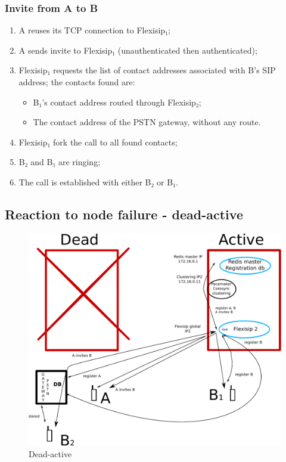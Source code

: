 \documentclass[a4paper,10pt]{article}
\begin{document}
\subsubsection{Invite from A to B}
\begin{enumerate}
 \item A reuses its TCP connection to Flexisip₁;
 \item A sends invite to Flexisip₁ (unauthenticated then authenticated);
 \item Flexisip₁ requests the list of contact addresses associated with B's SIP address; the contacts found are:
    \begin{itemize}
      \item B₁'s contact address routed through Flexisip₂;
      \item The contact address of the PSTN gateway, without any route.
    \end{itemize}
 \item Flexisip₁ fork the call to all found contacts;
 \item B₂ and B₁ are ringing;
 \item The call is established with either B₂ or B₁.
\end{enumerate}





\subsection{Reaction to node failure - dead-active}

\begin{figure}[ht!]
 \centering
 \includegraphics[keepaspectratio=true, scale=0.7]{./schema_archi_flexisip_dead-active.pdf}
 \caption{Dead-active}
 \label{fig:archi_dead-active}
\end{figure}
\end{document}
